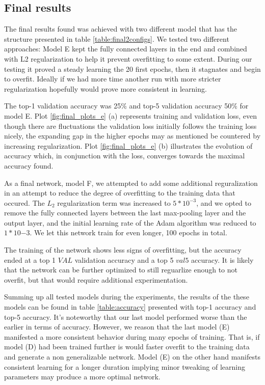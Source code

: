 \documentclass{kthreport}
\begin{document}
\subsection{Final results}





The final results found was achieved with two different model that has the structure presented in table \ref{table:final2configs}. We tested two different approaches: Model E kept the fully connected layers in the end and combined with L2 regularization to help it prevent overfitting to some extent. During our testing it proved a steady learning the 20 first epochs, then it stagnates and begin to overfit. Ideally if we had more time another run with more stricter regularization hopefully would prove more consistent in learning.





The top-1 validation accuracy was 25\% and top-5 validation accuracy 50\% for model E. Plot \ref{fig:final_plots_e} (a) represents training and validation loss, even though there are fluctuations the validation loss initially follows the training loss nicely, the expanding gap in the higher epochs may as mentioned be countered by increasing regularization. Plot \ref{fig:final_plots_e} (b) illustrates the evolution of accuracy which, in conjunction with the loss, converges towards the maximal accuracy found.


As a final network, model F,  we attempted to add some additional reguralization in an attempt to reduce the degree of overfitting to the training data that occured. The $L_{2}$ regularization term was increased to $5*10^{-3}$, and we opted to remove the fully connected layers between the last max-pooling layer and the output layer, and the initial learning rate of the Adam algorithm was reduced to $1*10{-3}$. We let this network train for even longer, 100 epochs in total.



The training of the network shows less signs of overfitting, but the accuracy ended at a top 1 $VAL$ validation accuracy and a top 5 $val5$ accuracy. It is likely that the network can be further optimized to still reguarlize enough to not overfit, but that would require additional experimentation.


Summing up all tested models during the experiments, the results of the these models can be found in table \ref{table:accuracy} presented with top-1 accuracy and top-5 accuracy. It's noteworthy that our last model performed worse than the earlier in terms of accuracy. However, we reason that the last model (E) manifested a more consistent behavior during many epochs of training. That is, if model (D) had been trained further is would faster overfit to the training data and generate a non generalizable network. Model (E) on the other hand manifests consistent learning for a longer duration implying minor tweaking of learning parameters may produce a more optimal network. \\
\end{document}
